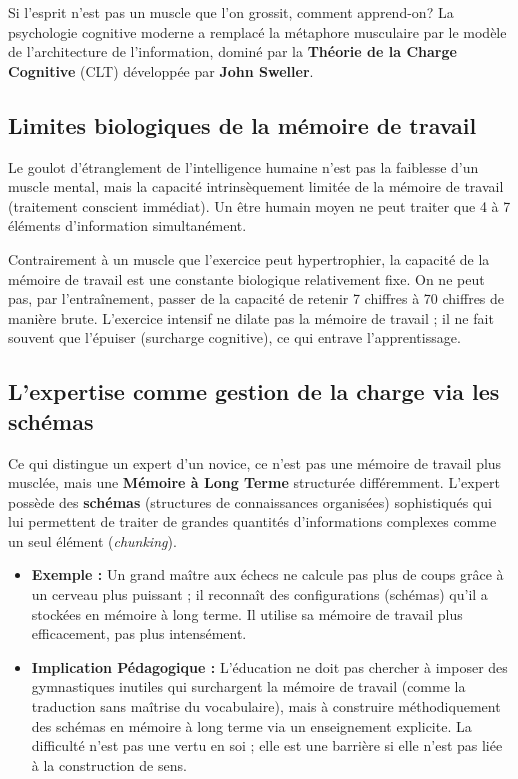 Si l'esprit n'est pas un muscle que l'on grossit, comment apprend-on? La psychologie cognitive
moderne a remplacé la métaphore musculaire par le modèle de l'architecture de l'information, dominé
par la \textbf{Théorie de la Charge Cognitive} (CLT) développée par \textbf{John
Sweller}.\cite{II-1-1-ref39}



\subsection{Limites biologiques de la mémoire de travail}

Le goulot d'étranglement de l'intelligence humaine n'est pas la \og faiblesse\fg{} d'un muscle
mental, mais la capacité intrinsèquement limitée de la mémoire de travail (traitement conscient
immédiat). Un être humain moyen ne peut traiter que 4 à 7 éléments d'information simultanément.

Contrairement à un muscle que l'exercice peut hypertrophier, la capacité de la mémoire de travail
est une constante biologique relativement fixe. On ne peut pas, par l'entraînement, passer de la
capacité de retenir 7 chiffres à 70 chiffres de manière brute.\cite{II-1-1-ref41} L'exercice
intensif ne \og dilate\fg{} pas la mémoire de travail ; il ne fait souvent que l'épuiser (surcharge
cognitive), ce qui entrave l'apprentissage.\cite{II-1-1-ref39}



\subsection{L'expertise comme gestion de la charge via les schémas}

Ce qui distingue un expert d'un novice, ce n'est pas une mémoire de travail plus \og musclée\fg{},
mais une \textbf{Mémoire à Long Terme} structurée différemment. L'expert possède des
\textbf{schémas} (structures de connaissances organisées) sophistiqués qui lui permettent de traiter
de grandes quantités d'informations complexes comme un seul élément
(\textit{chunking}).\cite{II-1-1-ref40}

\begin{itemize}\item \textbf{Exemple :} Un grand maître aux échecs ne \og calcule\fg{} pas plus de coups grâce à un cerveau plus puissant ; il reconnaît des configurations (schémas) qu'il a stockées en mémoire à long terme. Il utilise sa mémoire de travail plus efficacement, pas plus intensément.\item \textbf{Implication Pédagogique :} L'éducation ne doit pas chercher à imposer des \og gymnastiques\fg{} inutiles qui surchargent la mémoire de travail (comme la traduction sans maîtrise du vocabulaire), mais à construire méthodiquement des schémas en mémoire à long terme via un enseignement explicite.\cite{II-1-1-ref40} La difficulté n'est pas une vertu en soi ; elle est une barrière si elle n'est pas liée à la construction de sens.\end{itemize}

